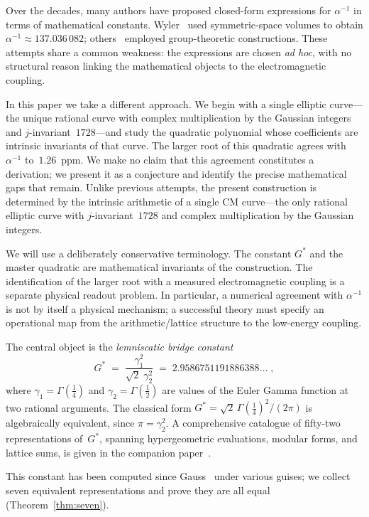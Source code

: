 \documentclass[12pt,reqno]{amsart}
\theoremstyle{definition}
\theoremstyle{remark}
\newcommand{\Gstar}{G^{\!*}}
\begin{document}
Over the decades, many authors have proposed closed-form expressions for
$\alpha^{-1}$ in terms of mathematical constants.  Wyler~\cite{Wyler} used
symmetric-space volumes to obtain $\alpha^{-1}\approx 137.036\,082$;
others~\cite{Gilmore} employed group-theoretic constructions.  These attempts
share a common weakness: the expressions are chosen \emph{ad hoc}, with no
structural reason linking the mathematical objects to the electromagnetic
coupling.

In this paper we take a different approach.  We begin with a single elliptic
curve---the unique rational curve with complex multiplication by the Gaussian
integers and $j$-invariant~$1728$---and study the quadratic polynomial whose
coefficients are intrinsic invariants of that curve.  The larger root of this
quadratic agrees with $\alpha^{-1}$ to~$1.26$~ppm.  We make no claim that this
agreement constitutes a derivation; we present it as a conjecture and identify
the precise mathematical gaps that remain.
Unlike previous attempts, the present construction is determined by the
intrinsic arithmetic of a single CM curve---the only rational elliptic curve
with $j$-invariant~$1728$ and complex multiplication by the Gaussian integers.

We will use a deliberately conservative terminology.  The constant $\Gstar$
and the master quadratic are mathematical invariants of the construction.  The
identification of the larger root with a measured electromagnetic coupling is a
separate physical readout problem.  In particular, a numerical agreement with
$\alpha^{-1}$ is not by itself a physical mechanism; a successful theory must
specify an operational map from the arithmetic/lattice structure to the
low-energy coupling.

The central object is the \emph{lemniscatic bridge constant}
\begin{equation}\label{eq:Gstar-def}
  \Gstar \;=\; \frac{\gamma_{1}^{2}}{\sqrt{2}\;\gamma_{2}^{2}}
  \;=\; 2.9586751191886388\ldots\;,
\end{equation}
where $\gamma_{1}=\Gamma(\tfrac14)$ and $\gamma_{2}=\Gamma(\tfrac12)$ are
values of the Euler Gamma function at two rational arguments.  The classical
form $\Gstar = \sqrt{2}\,\Gamma(\tfrac14)^{2}/(2\pi)$ is algebraically
equivalent, since $\pi = \gamma_{2}^{2}$.
A comprehensive catalogue of fifty-two representations of~$\Gstar$, spanning
hypergeometric evaluations, modular forms, and lattice sums, is given in the
companion paper~\cite{Paper2}.

This constant has been computed since Gauss~\cite{Gauss1799} under various
guises; we collect seven equivalent representations and prove they are all
equal (Theorem~\ref{thm:seven}).
\end{document}
